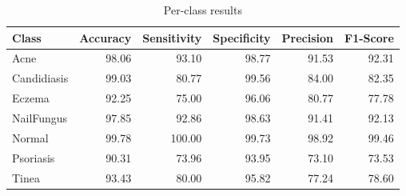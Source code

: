 \begin{table}
\caption{Per-class results}
\label{tab:results}
\begin{tabular}{lrrrrr}
\toprule
Class & Accuracy & Sensitivity & Specificity & Precision & F1-Score \\
\midrule
Acne & 98.06 & 93.10 & 98.77 & 91.53 & 92.31 \\
Candidiasis & 99.03 & 80.77 & 99.56 & 84.00 & 82.35 \\
Eczema & 92.25 & 75.00 & 96.06 & 80.77 & 77.78 \\
NailFungus & 97.85 & 92.86 & 98.63 & 91.41 & 92.13 \\
Normal & 99.78 & 100.00 & 99.73 & 98.92 & 99.46 \\
Psoriasis & 90.31 & 73.96 & 93.95 & 73.10 & 73.53 \\
Tinea & 93.43 & 80.00 & 95.82 & 77.24 & 78.60 \\
\bottomrule
\end{tabular}
\end{table}
